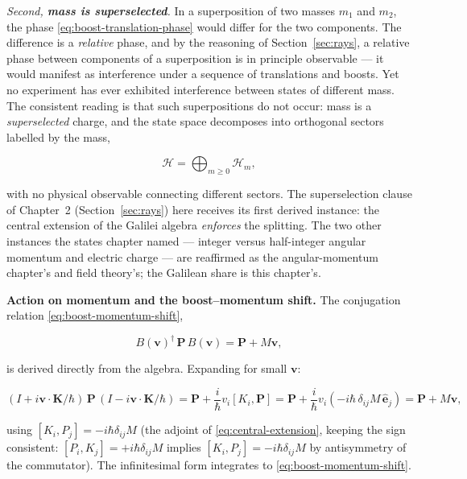 \emph{Second, \textbf{mass is superselected}.} In a superposition of two masses $m_{1}$ and $m_{2}$, the phase \eqref{eq:boost-translation-phase} would differ for the two components. The difference is a \emph{relative} phase, and by the reasoning of Section~\ref{sec:rays}, a relative phase between components of a superposition is in principle observable --- it would manifest as interference under a sequence of translations and boosts. Yet no experiment has ever exhibited interference between states of different mass. The consistent reading is that such superpositions do not occur: mass is a \emph{superselected} charge, and the state space decomposes into orthogonal sectors labelled by the mass,
\begin{linenomath}
\begin{equation}
\mathcal{H} = \bigoplus_{m\geq 0} \mathcal{H}_{m},
\label{eq:mass-decomposition}
\end{equation}
\end{linenomath}
with no physical observable connecting different sectors. The superselection clause of Chapter~2 (Section~\ref{sec:rays}) here receives its first derived instance: the central extension of the Galilei algebra \emph{enforces} the splitting. The two other instances the states chapter named --- integer versus half-integer angular momentum and electric charge --- are reaffirmed as the angular-momentum chapter's and field theory's; the Galilean share is this chapter's.

\medskip\noindent\textbf{Action on momentum and the boost--momentum shift.} The conjugation relation \eqref{eq:boost-momentum-shift},
\begin{linenomath}
\begin{equation}
B(\bm v)^{\dagger}\,\bm P\,B(\bm v) = \bm P + M\bm v,
\label{eq:boost-momentum-shift}
\end{equation}
\end{linenomath}
is derived directly from the algebra. Expanding for small $\bm v$:
\begin{linenomath}
\begin{equation*}
(I + i\bm v\!\cdot\!\bm K/\hbar)\,\bm P\,(I - i\bm v\!\cdot\!\bm K/\hbar)
= \bm P + \frac{i}{\hbar}v_{i}[K_{i},\bm P] = \bm P + \frac{i}{\hbar}v_{i}(-i\hbar\,\delta_{ij}M\,\hat{\bm e}_{j}) = \bm P + M\bm v,
\end{equation*}
\end{linenomath}
using $[K_i, P_j] = -i\hbar\delta_{ij}M$ (the adjoint of \eqref{eq:central-extension}, keeping the sign consistent: $[P_i,K_j] = +i\hbar\delta_{ij}M$ implies $[K_i,P_j] = -i\hbar\delta_{ij}M$ by antisymmetry of the commutator). The infinitesimal form integrates to \eqref{eq:boost-momentum-shift}.

